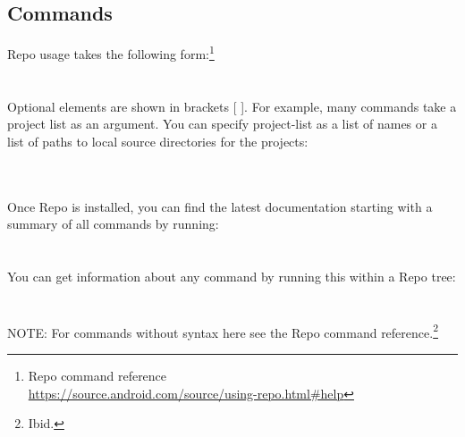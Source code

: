 \newpage
\subsection{Commands}
Repo usage takes the following form:\footnote{Repo command reference\\
\href{https://source.android.com/source/using-repo.html\#help}{https://source.android.com/source/using-repo.html\#help}}
\\
\indent {}
\\
\\
Optional elements are shown in brackets [ ].  For example, many commands take
a project list as an argument.  You can specify project-list as a list of
names or a list of paths to local source directories for the projects:

\indent {}\\
\indent {}
\\

\noindent Once Repo is installed, you can find the latest documentation
starting with a summary of all commands by running:
\\
\indent {}
\\
\\
\noindent You can get information about any command by running this within a Repo tree:
\\
\indent {}
\\
\\
NOTE: For  commands without syntax here see the 
Repo command reference.\footnote{Ibid.}


